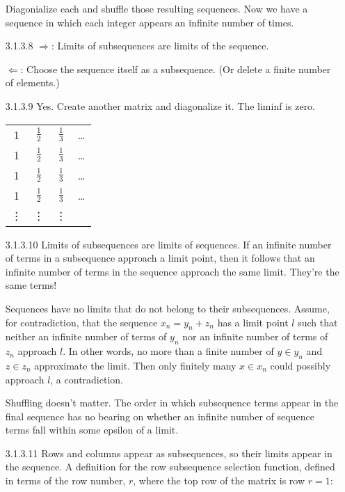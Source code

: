 \documentclass{article}
\begin{document}
\begin{enumerate}
  Diagonialize each and shuffle those resulting sequences. 
  Now we have a sequence in which each integer appears an infinite
  number of times. 
\item[]
\item[3.1.3.8]
  $\Rightarrow$: Limits of subsequences are limits of the sequence. 

  $\Leftarrow$: Choose the sequence itself as a subsequence.
    (Or delete a finite number of elements.)
\item[]
\item[3.1.3.9]
  Yes. Create another matrix and diagonalize it. The liminf is zero.
\item[]
  \begin{tabular}{c c c c}
   1 & $\frac{1}{2}$ & $\frac{1}{3}$ & \ldots \\
   1 & $\frac{1}{2}$ & $\frac{1}{3}$ & \ldots \\
   1 & $\frac{1}{2}$ & $\frac{1}{3}$ & \ldots \\
   1 & $\frac{1}{2}$ & $\frac{1}{3}$ & \ldots \\
   \vdots & \vdots & \vdots & \\
  \end{tabular} 
\item[]
\item[3.1.3.10]
  Limits of subsequences are limits of sequences. If an infinite
  number of terms in a subsequence approach a limit point, then it 
  follows that an infinite number of terms in the sequence approach the
  same limit. They're the same terms!

  Sequences have no limits that do not belong to their subsequences. 
  Assume, for contradiction, that the sequence $x_n = y_n + z_n$ has 
  a limit point $l$ such that neither an infinite number of terms 
  of $y_n$ nor an infinite number of terms of $z_n$ approach $l$. 
  In other words, no more than a finite number of $y\in y_n$ and 
  $z \in z_n$ approximate the limit. Then only finitely many $x\in x_n$
  could possibly approach $l$, a contradiction.

  Shuffling doesn't matter. The order in which subsequence terms appear
  in the final sequence has no bearing on whether an infinite number of 
  sequence terms fall within some epsilon of a limit.
\item[]
\item[3.1.3.11]
  Rows and columns appear as subsequences, so their limits appear in the
  sequence. A definition for the row subsequence selection function, 
  defined in terms of the row number, $r$, where the top row of the matrix
  is row $r=1$:


\end{enumerate}
\end{document}
